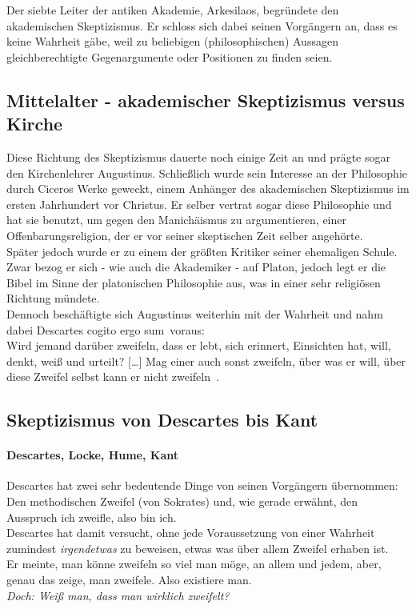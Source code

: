 \documentclass[12pt,a4paper]{article}
\begin{document}
Der siebte Leiter der antiken Akademie, Arkesilaos, begründete den akademischen Skeptizismus. Er schloss sich dabei seinen Vorgängern an, dass es keine Wahrheit gäbe, weil zu beliebigen (philosophischen) Aussagen gleichberechtigte Gegenargumente oder Positionen zu finden seien.
	\subsection{Mittelalter - akademischer Skeptizismus versus Kirche}
Diese Richtung des Skeptizismus dauerte noch einige Zeit an und prägte sogar den Kirchenlehrer Augustinus. Schließlich wurde sein Interesse an der Philosophie durch Ciceros Werke geweckt, einem Anhänger des akademischen Skeptizismus im ersten Jahrhundert vor Christus. Er selber vertrat sogar diese Philosophie und hat sie benutzt, um gegen den Manichäismus zu argumentieren, einer Offenbarungsreligion, der er vor seiner skeptischen Zeit selber angehörte.\\%
Später jedoch wurde er zu einem der größten Kritiker seiner ehemaligen Schule. Zwar bezog er sich - wie auch die Akademiker - auf Platon, jedoch legt er die Bibel im Sinne der platonischen Philosophie aus, was in einer sehr religiösen Richtung mündete.\\%
Dennoch beschäftigte sich Augustinus weiterhin mit der Wahrheit und nahm dabei Descartes \glqq cogito ergo sum\grqq\ voraus:\\
\glqq Wird jemand darüber zweifeln, dass er lebt, sich erinnert, Einsichten hat, will, denkt, weiß und urteilt? [\ldots] Mag einer auch sonst zweifeln, über was er will, über diese Zweifel selbst kann er nicht zweifeln\grqq\ \cite{de_trini_x}.
	\subsection{Skeptizismus von Descartes bis Kant}
		\paragraph{Descartes, Locke, Hume, Kant}
Descartes hat zwei sehr bedeutende Dinge von seinen Vorgängern übernommen: Den methodischen Zweifel (von Sokrates) und, wie gerade erwähnt, den Ausspruch \glqq ich zweifle, also bin ich\grqq.\\%
Descartes hat damit versucht, ohne jede Voraussetzung von einer Wahrheit zumindest \emph{irgendetwas} zu \glqq beweisen\grqq, etwas was über allem Zweifel erhaben ist.\\
Er meinte, man könne zweifeln so viel man möge, an allem und jedem, aber, genau das zeige, man zweifele. Also existiere man.\\ %
\emph{Doch: Weiß man, dass man wirklich zweifelt?} %
\end{document}

